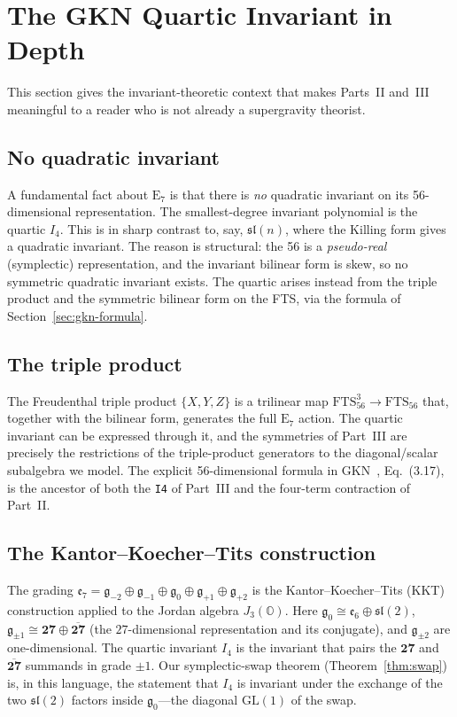 \documentclass[11pt]{article}
\theoremstyle{definition}
\newcommand{\OO}{\mathbb{O}}
\newcommand{\Jthree}{J_3(\OO)}
\newcommand{\Iq}{I_4}
\newcommand{\FTS}{\mathrm{FTS}_{56}}
\newcommand{\Eseven}{\mathrm{E}_7}
\begin{document}
\section{The GKN Quartic Invariant in Depth}
\label{sec:gkn-deep}

This section gives the invariant-theoretic context that makes Parts~II and~III
meaningful to a reader who is not already a supergravity theorist.

\subsection{No quadratic invariant}
\label{sec:gkn-noquad}

A fundamental fact about $\Eseven$ is that there is \emph{no} quadratic
invariant on its 56-dimensional representation. The smallest-degree invariant
polynomial is the quartic $\Iq$. This is in sharp contrast to, say,
$\mathfrak{sl}(n)$, where the Killing form gives a quadratic invariant. The
reason is structural: the 56 is a \emph{pseudo-real} (symplectic) representation,
and the invariant bilinear form is skew, so no symmetric quadratic invariant
exists. The quartic arises instead from the triple product and the symmetric
bilinear form on the FTS, via the formula of Section~\ref{sec:gkn-formula}.

\subsection{The triple product}
\label{sec:gkn-triple}

The Freudenthal triple product $\{X,Y,Z\}$ is a trilinear map
$\FTS^3\to\FTS$ that, together with the bilinear form, generates the full
$\Eseven$ action. The quartic invariant can be expressed through it, and the
symmetries of Part~III are precisely the restrictions of the triple-product
generators to the diagonal/scalar subalgebra we model. The explicit 56-dimensional
formula in GKN~\cite{gkn2001}, Eq.~(3.17), is the ancestor of both the
\texttt{I4} of Part~III and the four-term contraction of Part~II.

\subsection{The Kantor--Koecher--Tits construction}
\label{sec:gkn-kkt}

The grading
$\mathfrak{e}_7=\mathfrak{g}_{-2}\oplus\mathfrak{g}_{-1}\oplus
\mathfrak{g}_0\oplus\mathfrak{g}_{+1}\oplus\mathfrak{g}_{+2}$ is the
Kantor--Koecher--Tits (KKT) construction applied to the Jordan algebra
$\Jthree$. Here $\mathfrak{g}_0\cong\mathfrak{e}_6\oplus\mathfrak{sl}(2)$,
$\mathfrak{g}_{\pm1}\cong\mathbf{27}\oplus\overline{\mathbf{27}}$ (the
$27$-dimensional representation and its conjugate), and $\mathfrak{g}_{\pm2}$
are one-dimensional. The quartic invariant $\Iq$ is the invariant that pairs
the $\mathbf{27}$ and $\overline{\mathbf{27}}$ summands in grade $\pm1$. Our
symplectic-swap theorem (Theorem~\ref{thm:swap}) is, in this language, the
statement that $\Iq$ is invariant under the exchange of the two
$\mathfrak{sl}(2)$ factors inside $\mathfrak{g}_0$---the diagonal
$\mathrm{GL}(1)$ of the swap.
\end{document}
